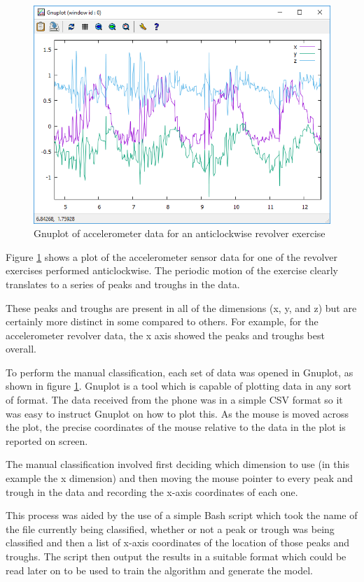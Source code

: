 \begin{figure}
	\centering
	\includegraphics[width=1.0\textwidth]{figures/classification_data_plot.png}
	\caption{Gnuplot of accelerometer data for an anticlockwise revolver exercise\label{fig:gnuplot-rev}}
\end{figure}

Figure \ref{fig:gnuplot-rev} shows a plot of the accelerometer sensor data for one of the revolver exercises performed anticlockwise. The periodic motion of the exercise clearly translates to a series of peaks and troughs in the data.

These peaks and troughs are present in all of the dimensions (x, y, and z) but are certainly more distinct in some compared to others.  For example, for the accelerometer revolver data, the x axis showed the peaks and troughs best overall.

To perform the manual classification, each set of data was opened in Gnuplot, as shown in figure \ref{fig:gnuplot-rev}. Gnuplot is a tool which is capable of plotting data in any sort of format. The data received from the phone was in a simple CSV format so it was easy to instruct Gnuplot on how to plot this. As the mouse is moved across the plot, the precise coordinates of the mouse relative to the data in the plot is reported on screen. 

The manual classification involved first deciding which dimension to use (in this example the x dimension) and then moving the mouse pointer to every peak and trough in the data and recording the x-axis coordinates of each one.

This process was aided by the use of a simple Bash script which took the name of the file currently being classified, whether or not a peak or trough was being classified and then a list of x-axis coordinates of the location of those peaks and troughs. The script then output the results in a suitable format which could be read later on to be used to train the algorithm and generate the model.

